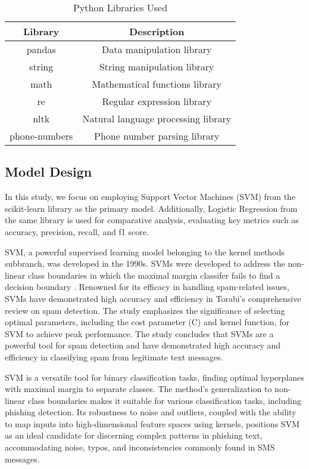 \documentclass[conference]{IEEEtran}
\begin{document}
\begin{table}[htbp]
    \centering
    \caption{Python Libraries Used}
    \label{tab:python_libraries}
    \begin{tabular}{|c|c|}
        \hline
        \textbf{Library} & \textbf{Description} \\
        \hline
        pandas & Data manipulation library \\
        \hline
        string & String manipulation library \\
        \hline
        math & Mathematical functions library \\
        \hline
        re & Regular expression library \\
        \hline
        nltk & Natural language processing library \\
        \hline
        phone-numbers & Phone number parsing library \\
        \hline
    \end{tabular}
\end{table}


\subsection*{Model Design}
In this study, we focus on employing Support Vector Machines (SVM) from the scikit-learn library as the primary model. Additionally, Logistic Regression from the same library is used for comparative analysis, evaluating key metrics such as accuracy, precision, recall, and f1 score.

SVM, a powerful supervised learning model belonging to the kernel methods subbranch, was developed in the 1990s. SVMs were developed to address the non-linear class boundaries in which the maximal margin classifer fails to find a decision boundary \cite{james2013}\cite{geron2019}. Renowned for its efficacy in handling spam-related issues, SVMs have demonstrated high accuracy and efficiency in Torabi's \cite{torabi2015} comprehensive review on spam detection. The study emphasizes the significance of selecting optimal parameters, including the cost parameter (C) and kernel function, for SVM to achieve peak performance. The study concludes that SVMs are a powerful tool for spam detection and have demonstrated high accuracy and efficiency in classifying spam from legitimate text messages. 

SVM is a versatile tool for binary classification tasks, finding optimal hyperplanes with maximal margin to separate classes. The method's generalization to non-linear class boundaries makes it suitable for various classification tasks, including phishing detection. Its robustness to noise and outliers, coupled with the ability to map inputs into high-dimensional feature spaces using kernels, positions SVM as an ideal candidate for discerning complex patterns in phishing text, accommodating noise, typos, and inconsistencies commonly found in SMS messages.
\end{document}
